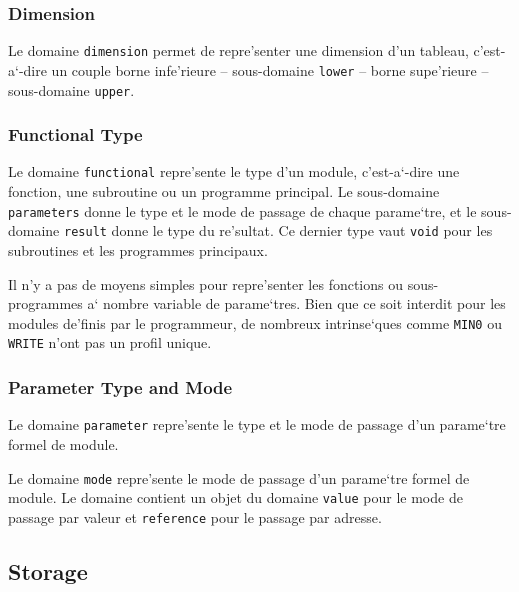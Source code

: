 \subsubsection{Dimension}
\label{subsubsection-dimension}

{
Le domaine \verb/dimension/ permet de repre'senter une dimension d'un
tableau, c'est-a`-dire un couple borne infe'rieure -- sous-domaine
\verb/lower/ -- borne supe'rieure -- sous-domaine \verb/upper/.
}

\subsubsection{Functional Type}
\label{subsubsection-functional}

{ Le domaine \verb/functional/ repre'sente le type d'un module,
c'est-a`-dire une fonction, une subroutine ou un programme principal. Le
sous-domaine \verb/parameters/ donne le type et le mode de passage de
chaque parame`tre, et le sous-domaine \verb/result/ donne le type du
re'sultat. Ce dernier type vaut \verb/void/ pour les subroutines et les
programmes principaux.

Il n'y a pas de moyens simples pour repre'senter les fonctions ou
sous-programmes a` nombre variable de parame`tres. Bien que ce soit
interdit pour les modules de'finis par le programmeur, de nombreux
intrinse`ques comme \verb+MIN0+ ou \verb+WRITE+ n'ont pas un profil
unique.  }

\subsubsection{Parameter Type and Mode}
\label{subsubsection-parameter}

{
Le domaine \verb/parameter/ repre'sente le type et le mode de passage d'un
parame`tre formel de module. 
}

{
Le domaine \verb/mode/ repre'sente le mode de passage d'un parame`tre
formel de module. Le domaine contient un objet du domaine \verb/value/
pour le mode de passage par valeur et \verb/reference/ pour le passage
par adresse.
}

\subsection{Storage}
\label{subsection-storage}

